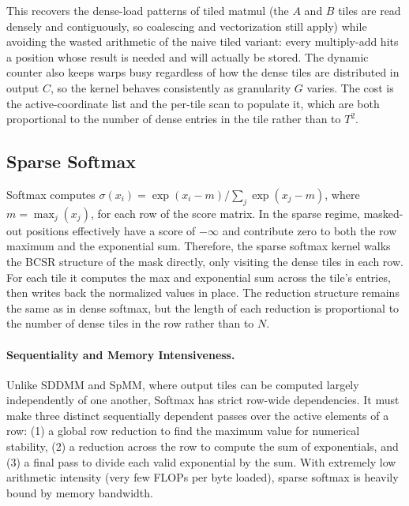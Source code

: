 \documentclass[11pt]{article}
\begin{document}
This recovers the dense-load patterns of tiled matmul (the $A$ and $B$ tiles are read densely and contiguously, so coalescing and vectorization still apply) while avoiding the wasted arithmetic of the naive tiled variant: every multiply-add hits a position whose result is needed and will actually be stored. The dynamic counter also keeps warps busy regardless of how the dense tiles are distributed in output $C$, so the kernel behaves consistently as granularity $G$ varies. The cost is the active-coordinate list and the per-tile scan to populate it, which are both proportional to the number of dense entries in the tile rather than to $T^2$.


\subsection*{Sparse Softmax}
Softmax computes $\sigma(x_i) = \exp(x_i - m) / \sum_j \exp(x_j - m)$, where $m = \max_j(x_j)$, for each row of the score matrix. In the sparse regime, masked-out positions effectively have a score of $-\infty$ and contribute zero to both the row maximum and the exponential sum. Therefore, the sparse softmax kernel walks the BCSR structure of the mask directly, only visiting the dense tiles in each row. For each tile it computes the max and exponential sum across the tile's entries, then writes back the normalized values in place. The reduction structure remains the same as in dense softmax, but the length of each reduction is proportional to the number of dense tiles in the row rather than to $N$.

\paragraph{Sequentiality and Memory Intensiveness.}
Unlike SDDMM and SpMM, where output tiles can be computed largely independently of one another, Softmax has strict row-wide dependencies. It must make three distinct sequentially dependent passes over the active elements of a row: (1) a global row reduction to find the maximum value for numerical stability, (2) a reduction across the row to compute the sum of exponentials, and (3) a final pass to divide each valid exponential by the sum. With extremely low arithmetic intensity (very few FLOPs per byte loaded), sparse softmax is heavily bound by memory bandwidth.
\end{document}

